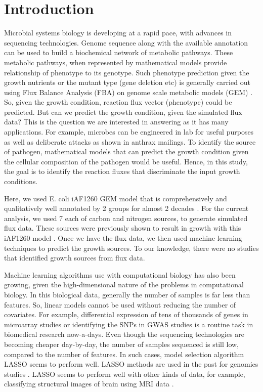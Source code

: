 \documentclass[12pt]{article}
\begin{document}
\section*{Introduction}
Microbial systems biology is developing at a rapid pace, with advances in sequencing technologies. Genome sequence along with the available annotation can be used to build a biochemical network of metabolic pathways. These metabolic pathways, when represented by mathematical models provide relationship of phenotype to its genotype. Such phenotype prediction given the growth nutrients or the mutant type (gene deletion etc) is generally carried out using Flux Balance Analysis (FBA) \cite{Orthetal2010} on genome scale metabolic  models (GEM) \cite{EdwardsPalsson2000, Karpetal1996, OuzounisKarp2000}. So, given the growth condition, reaction flux vector (phenotype) could be predicted. But can we predict the growth condition, given the simulated flux data? This is the question we are interested in answering as it has many applications. For example, microbes can be engineered in lab for useful purposes as well as deliberate attacks as shown in anthrax mailings. To identify the source of pathogen, mathematical models that can predict the growth condition given the cellular composition of the pathogen would be useful. Hence, in this study, the goal is to identify the reaction fluxes that discriminate the input growth conditions. 

\bigskip
\noindent
Here, we used E. coli iAF1260 GEM model \cite{Feistetal2007} that is comprehensively and qualitatively well annotated by 2 groups for almost 2 decades \cite{EdwardsPalsson2000,Reedetal2003,Feistetal2007,Orthetal2012}. For the current analysis, we used 7 each of carbon and nitrogen sources, to generate simulated flux data. These sources were previously shown to result in growth with this iAF1260 model \cite{Feistetal2007}. Once we have the flux data, we then used machine learning techniques to predict the growth sources. To our knowledge, there were no studies that identified growth sources from flux data.

\bigskip
\noindent
Machine learning algorithms use with computational biology has also been growing, given the high-dimensional nature of the problems in computational biology. In this biological data, generally the number of samples is far less than features. So, linear models cannot be used without reducing the number of covariates.  For example, differential expression of tens of thousands of genes in microarray studies or identifying the SNPs in GWAS studies is a routine task in biomedical research now-a-days. Even though the sequencing technologies are becoming cheaper day-by-day, the number of samples sequenced is still low, compared to the number of features. In such cases, model selection algorithm LASSO \cite{Tibshirani1996} seems to perform well. LASSO methods are used in the past for genomics studies \cite{Wuetal2009}. LASSO seems to perform well with other kinds of data, for example, classifying structural images of brain using MRI data \cite{Casanovaetal2011,Casanovaetal2012,Wangetal2012}.
\end{document}
